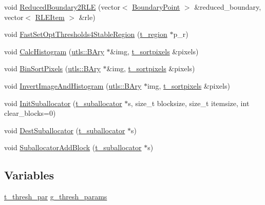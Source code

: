 \begin{CompactItemize}
\item 
void \hyperlink{namespaceextrema_58b3b98f8ba949fa8d8ec9dc449d52f9}{Reduced\-Boundary2RLE} (vector$<$ \hyperlink{structextrema_1_1BoundaryPoint}{Boundary\-Point} $>$ \&reduced\_\-boundary, vector$<$ \hyperlink{structextrema_1_1RLEItem}{RLEItem} $>$ \&rle)
\item 
void \hyperlink{namespaceextrema_2a889580edf196cf69706d7fa8db0f48}{Fast\-Set\-Opt\-Thresholds4Stable\-Region} (\hyperlink{structextrema_1_1s__region}{t\_\-region} $\ast$p\_\-r)
\item 
void \hyperlink{namespaceextrema_2992a096fc1f046963a07489ab316d30}{Calc\-Histogram} (\hyperlink{structutls_1_1Ary}{utls::BAry} $\ast$\&img, \hyperlink{structextrema_1_1s__sortpixels}{t\_\-sortpixels} \&pixels)
\item 
void \hyperlink{namespaceextrema_85efee4f382151dffcde01fae9e024a2}{Bin\-Sort\-Pixels} (\hyperlink{structutls_1_1Ary}{utls::BAry} $\ast$\&img, \hyperlink{structextrema_1_1s__sortpixels}{t\_\-sortpixels} \&pixels)
\item 
void \hyperlink{namespaceextrema_15d6b1b2157ca27ca1aa21c4508ee33f}{Invert\-Image\-And\-Histogram} (\hyperlink{structutls_1_1Ary}{utls::BAry} $\ast$img, \hyperlink{structextrema_1_1s__sortpixels}{t\_\-sortpixels} \&pixels)
\item 
void \hyperlink{namespaceextrema_0b971925373c3684db10539689b21879}{Init\-Suballocator} (\hyperlink{structextrema_1_1s__suballocator}{t\_\-suballocator} $\ast$s, size\_\-t blocksize, size\_\-t itemsize, int clear\_\-blocks=0)
\item 
void \hyperlink{namespaceextrema_bf7e7f237cf6664202fe8dcccec27460}{Dest\-Suballocator} (\hyperlink{structextrema_1_1s__suballocator}{t\_\-suballocator} $\ast$s)
\item 
void \hyperlink{namespaceextrema_f6d0202116fc2bffdeaa457b528063c5}{Suballocator\-Add\-Block} (\hyperlink{structextrema_1_1s__suballocator}{t\_\-suballocator} $\ast$s)
\end{CompactItemize}
\subsection*{Variables}
\begin{CompactItemize}
\item 
\hyperlink{structextrema_1_1s__thresh__par}{t\_\-thresh\_\-par} \hyperlink{namespaceextrema_f4f063a8b77240d1f9e60783393438f1}{g\_\-thresh\_\-params}
\end{CompactItemize}


